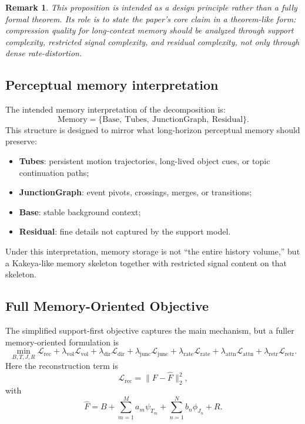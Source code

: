 \documentclass[11pt]{article}
\newtheorem{remark}{Remark}
\begin{document}
\begin{remark}
This proposition is intended as a design principle rather than a fully formal theorem. Its role is to state the paper's core claim in a theorem-like form: compression quality for long-context memory should be analyzed through support complexity, restricted signal complexity, and residual complexity, not only through dense rate-distortion.
\end{remark}

\subsection{Perceptual memory interpretation}
The intended memory interpretation of the decomposition is:
\begin{equation}
\mathrm{Memory} = \{\mathrm{Base},\ \mathrm{Tubes},\ \mathrm{JunctionGraph},\ \mathrm{Residual}\}.
\end{equation}
This structure is designed to mirror what long-horizon perceptual memory should preserve:
\begin{itemize}[leftmargin=1.5em]
\item \textbf{Tubes}: persistent motion trajectories, long-lived object cues, or topic continuation paths;
\item \textbf{JunctionGraph}: event pivots, crossings, merges, or transitions;
\item \textbf{Base}: stable background context;
\item \textbf{Residual}: fine details not captured by the support model.
\end{itemize}
Under this interpretation, memory storage is not ``the entire history volume,'' but a Kakeya-like memory skeleton together with restricted signal content on that skeleton.

\subsection{Full Memory-Oriented Objective}
The simplified support-first objective captures the main mechanism, but a fuller memory-oriented formulation is
\begin{equation}
\min_{B,T,J,R}
\mathcal{L}_{\mathrm{rec}}
+ \lambda_{\mathrm{vol}}\mathcal{L}_{\mathrm{vol}}
+ \lambda_{\mathrm{dir}}\mathcal{L}_{\mathrm{dir}}
+ \lambda_{\mathrm{junc}}\mathcal{L}_{\mathrm{junc}}
+ \lambda_{\mathrm{rate}}\mathcal{L}_{\mathrm{rate}}
+ \lambda_{\mathrm{attn}}\mathcal{L}_{\mathrm{attn}}
+ \lambda_{\mathrm{retr}}\mathcal{L}_{\mathrm{retr}}.
\end{equation}
Here the reconstruction term is
\begin{equation}
\mathcal{L}_{\mathrm{rec}}=\|F-\hat F\|_2^2,
\end{equation}
with
\begin{equation}
\hat F
=
B
+ \sum_{m=1}^{M} a_m\psi_{T_m}
+ \sum_{n=1}^{N} b_n\phi_{J_n}
+ R.
\end{equation}
\end{document}
